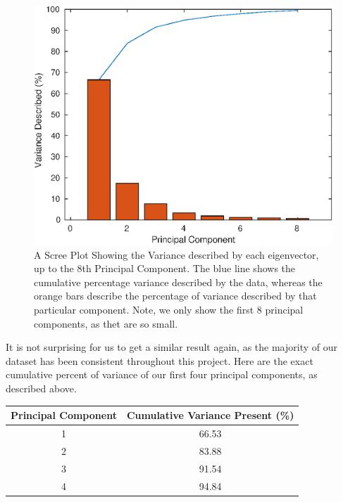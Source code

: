 \documentclass{article}
\begin{document}
\begin{figure}[H]
\centering
\caption{A Scree Plot Showing the Variance described by each eigenvector, up to the 8th Principal Component. The blue line shows the cumulative percentage variance described by the data, whereas the orange bars describe the percentage of variance described by that particular component. Note, we only show the first 8 principal components, as thet are so small.}
\includegraphics[scale = 0.75]{final/scree_plot_btc.eps}
\end{figure}

It is not surprising for us to get a similar result again, as the majority of our dataset has been consistent throughout this project. Here are the exact cumulative percent of variance of our first four principal components, as described above.

\begin{center}
\begin{tabular}{ |c|c| } 
\hline
Principal Component & Cumulative Variance Present (\%) \\
\hline
1 & 66.53 \\ 
2 & 83.88 \\ 
3 & 91.54 \\ 
4 & 94.84 \\
\hline
\end{tabular}
\end{center}
\end{document}
